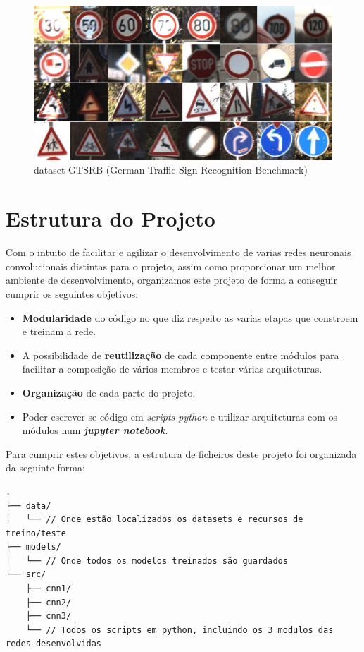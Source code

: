 \documentclass[a4paper]{report}
\begin{document}
\begin{figure}[H]
    \centering
    \includegraphics[scale=0.8]{images/gtsrb.png}
    \caption{dataset GTSRB (German Traffic Sign Recognition Benchmark)}
    \label{fig:traffic_signs_example}
\end{figure}

\chapter{Estrutura do Projeto}

Com o intuito de facilitar e agilizar o desenvolvimento de varias redes neuronais
convolucionais distintas para o projeto, assim como proporcionar um melhor ambiente
de desenvolvimento, organizamos este projeto de forma a conseguir cumprir os
seguintes objetivos:
\begin{itemize}
  \item \textbf{Modularidade} do código no que diz respeito as varias etapas que
  constroem e treinam a rede.
  \item A possibilidade de \textbf{reutilização} de cada componente entre módulos
  para facilitar a composição de vários membros e testar várias arquiteturas.
  \item \textbf{Organização} de cada parte do projeto.
  \item Poder escrever-se código em \textit{scripts python} e utilizar arquiteturas
  com os módulos num \textit{\textbf{jupyter notebook}}.
\end{itemize}

Para cumprir estes objetivos, a estrutura de ficheiros deste projeto foi organizada
da seguinte forma:

\begin{verbatim}
.
├── data/
│   └── // Onde estão localizados os datasets e recursos de treino/teste
├── models/
│   └── // Onde todos os modelos treinados são guardados
└── src/
    ├── cnn1/
    ├── cnn2/
    ├── cnn3/
    └── // Todos os scripts em python, incluindo os 3 modulos das redes desenvolvidas
\end{verbatim}
\end{document}
